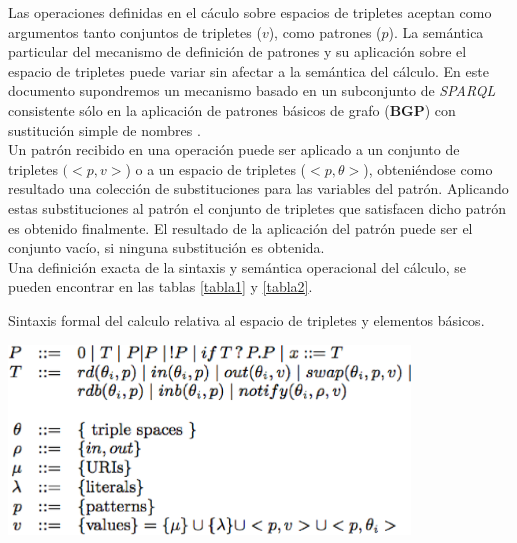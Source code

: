 Las operaciones definidas en el c\'aculo sobre espacios de tripletes aceptan como argumentos tanto conjuntos de tripletes ($v$), como patrones ($p$). La sem\'antica particular del mecanismo de definici\'on de patrones y su aplicaci\'on sobre el espacio de tripletes puede variar sin afectar a la sem\'antica del c\'alculo. En este documento supondremos un mecanismo basado en un subconjunto de \textit{SPARQL} consistente s\'olo en la aplicaci\'on de patrones b\'asicos de grafo (\textbf{BGP}) con sustituci\'on simple de nombres \cite{sparql}.\\
Un patr\'on recibido en una operaci\'on puede ser aplicado a un conjunto de tripletes $(< p,v >$) o a un espacio de tripletes ($< p,\theta >$), obteni\'endose como resultado una colecci\'on de substituciones para las variables del patr\'on. Aplicando estas substituciones al patr\'on el conjunto de tripletes que satisfacen dicho patr\'on es obtenido finalmente. El resultado de la aplicaci\'on del patr\'on puede ser el conjunto vac\'io, si ninguna substituci\'on es obtenida.\\
Una definici\'on exacta de la sintaxis y sem\'antica operacional del c\'alculo, se pueden encontrar en las tablas \ref{tabla1} y \ref{tabla2}.\\

\begin{table}
\vspace{2.4in}
\caption{Sintaxis formal del calculo relativa al espacio de tripletes y elementos b\'asicos.}
\includegraphics[width=0.8\textwidth]{tabla1}
\label{tabla1}
\end{table}



